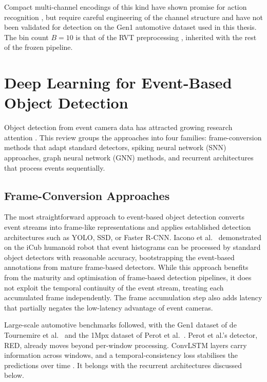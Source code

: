 \documentclass[11pt, a4paper]{report}
\begin{document}
Compact multi-channel encodings of this kind have shown promise for action recognition \cite{innocenti2021temporal}, but require careful engineering of the channel structure and have not been validated for detection on the Gen1 automotive dataset used in this thesis. The bin count $B = 10$ is that of the RVT preprocessing \cite{gehrig2023recurrent}, inherited with the rest of the frozen pipeline.

\section{Deep Learning for Event-Based Object Detection}
Object detection from event camera data has attracted growing research attention \cite{zheng2023deep}. This review groups the approaches into four families: frame-conversion methods that adapt standard detectors, spiking neural network (SNN) approaches, graph neural network (GNN) methods, and recurrent architectures that process events sequentially.

\subsection{Frame-Conversion Approaches}
The most straightforward approach to event-based object detection converts event streams into frame-like representations and applies established detection architectures such as YOLO, SSD, or Faster R-CNN. Iacono et al.~\cite{iacono2018towards} demonstrated on the iCub humanoid robot that event histograms can be processed by standard object detectors with reasonable accuracy, bootstrapping the event-based annotations from mature frame-based detectors. While this approach benefits from the maturity and optimisation of frame-based detection pipelines, it does not exploit the temporal continuity of the event stream, treating each accumulated frame independently. The frame accumulation step also adds latency that partially negates the low-latency advantage of event cameras.

Large-scale automotive benchmarks followed, with the Gen1 dataset of de Tournemire et al.~\cite{detournemire2020large} and the 1Mpx dataset of Perot et al.~\cite{perot2020learning}. Perot et al.'s detector, RED, already moves beyond per-window processing. ConvLSTM layers carry information across windows, and a temporal-consistency loss stabilises the predictions over time \cite{perot2020learning}. It belongs with the recurrent architectures discussed below.
\end{document}
